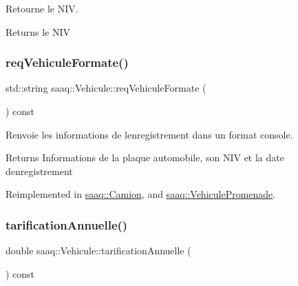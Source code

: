 Retourne le N\+IV. 

\begin{DoxyReturn}{Returns}
le N\+IV 
\end{DoxyReturn}
\mbox{\label{classsaaq_1_1Vehicule_a9d0ff95273ecd7858cf9bd12aac359ba}} 
\subsubsection{\texorpdfstring{req\+Vehicule\+Formate()}{reqVehiculeFormate()}}
{\footnotesize\ttfamily std\+::string saaq\+::\+Vehicule\+::req\+Vehicule\+Formate (\begin{DoxyParamCaption}{ }\end{DoxyParamCaption}) const\hspace{0.3cm}{\ttfamily [virtual]}}



Renvoie les informations de l\textquotesingle{}enregistrement dans un format console. 

\begin{DoxyReturn}{Returns}
Informations de la plaque automobile, son N\+IV et la date d\textquotesingle{}enregistrement 
\end{DoxyReturn}


Reimplemented in \hyperlink{classsaaq_1_1Camion_a7e352c9d011c145497fa19d16482bd9a}{saaq\+::\+Camion}, and \hyperlink{classsaaq_1_1VehiculePromenade_a338b22f240c47613ba08f37bf717658b}{saaq\+::\+Vehicule\+Promenade}.

\mbox{\label{classsaaq_1_1Vehicule_a93570921069d25b6bc48cf04af176395}} 
\subsubsection{\texorpdfstring{tarification\+Annuelle()}{tarificationAnnuelle()}}
{\footnotesize\ttfamily double saaq\+::\+Vehicule\+::tarification\+Annuelle (\begin{DoxyParamCaption}{ }\end{DoxyParamCaption}) const\hspace{0.3cm}{\ttfamily [pure virtual]}}



